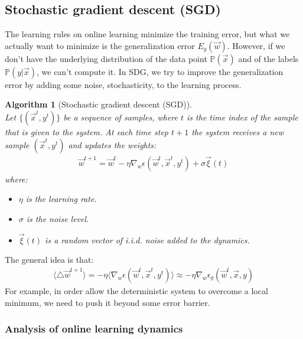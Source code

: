 \documentclass[11pt]{book} %
\newtheorem{algorithm}{Algorithm}[section]
\begin{document}
\subsection{Stochastic gradient descent (SGD)}
The learning rules on online learning minimize the training error, but what we actually want to minimize is the generalization error $E_{g}(\vec{w})$.
However, if we don't have the underlying distribution of the data point $\mathbb{P}(\vec{x})$ and of the labels $\mathbb{P}(y|\vec{x})$, we can't compute it.
In SDG, we try to improve the generalization error by adding some noise, stochasticity, to the learning process.

\begin{algorithm}[Stochastic gradient descent (SGD)]\ \\
    Let $\{ (\vec{x}^t, y^t) \}$ be a sequence of samples, where $t$ is the time index of the sample that is given to the system.
    At each time step $t+1$ the system receives a new sample $(\vec{x}^{t}, y^{t})$ and updates the weights: 
    \begin{align}
        \vec{w}^{t+1} = \vec{w}^{t} - \eta \nabla_w \epsilon(\vec{w}^{t}, \vec{x}^{t}, y^{t}) + \sigma \vec{\xi}(t) 
    \end{align}
    where: 
    \begin{itemize}
        \item $\eta$ is the learning rate.
        \item $\sigma$ is the noise level.
        \item $\vec{\xi}(t)$ is a random vector of i.i.d. noise added to the dynamics.
    \end{itemize}
\end{algorithm}
The general idea is that:
\begin{align*}
    \langle \bigtriangleup \vec{w}^{t+1} \rangle = - \eta \langle \nabla_w \epsilon(\vec{w}^{t}, \vec{x}^{t}, y^{t}) \rangle \approx -\eta \nabla_w \epsilon_g (\vec{w}^{t}, \vec{x}, y) 
\end{align*}
For example, in order allow the deterministic system to overcome a local minimum, we need to push it beyond some error barrier.

%
%



%
%

\subsubsection{Analysis of online learning dynamics}
\end{document}
